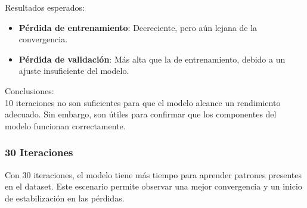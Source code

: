 \documentclass{article}
\begin{document}
{\large{Resultados esperados}}:
\begin{itemize}
    \item \textbf{Pérdida de entrenamiento}: Decreciente, pero aún lejana de la convergencia.
    \item \textbf{Pérdida de validación}: Más alta que la de entrenamiento, debido a un ajuste insuficiente del modelo.
\end{itemize}

{\large{Conclusiones}}: \\

10 iteraciones no son suficientes para que el modelo alcance un rendimiento adecuado. Sin embargo, son útiles para confirmar que los componentes del modelo funcionan correctamente.

\newpage

\subsubsection{30 Iteraciones}
Con 30 iteraciones, el modelo tiene más tiempo para aprender patrones presentes en el dataset. Este escenario permite observar una mejor convergencia y un inicio de estabilización en las pérdidas. \\
\end{document}
